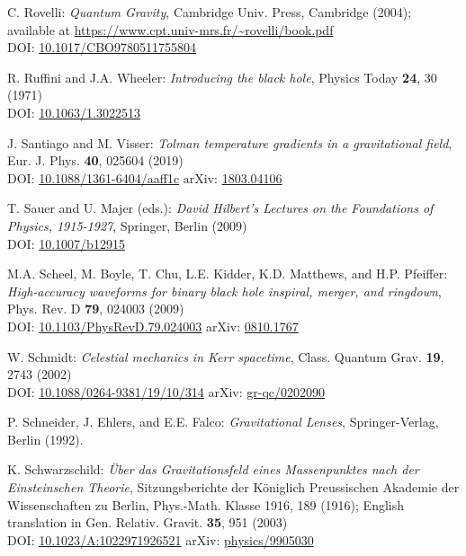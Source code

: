 \begin{thebibliography}{123}
C. Rovelli:
{\em Quantum Gravity},
Cambridge Univ. Press, Cambridge (2004); available at
\url{https://www.cpt.univ-mrs.fr/~rovelli/book.pdf}\\
DOI: \href{https://doi.org/10.1017/CBO9780511755804}{10.1017/CBO9780511755804}

R. Ruffini and J.A. Wheeler:
{\em Introducing the black hole},
Physics Today {\bf 24}, 30 (1971)\\
DOI: \href{https://doi.org/10.1063/1.3022513}{10.1063/1.3022513}

J. Santiago and M. Visser:
{\em Tolman temperature gradients in a gravitational field},
Eur. J. Phys. {\bf 40}, 025604 (2019)\\
DOI: \href{https://doi.org/10.1088/1361-6404/aaff1c}{10.1088/1361-6404/aaff1c}\hfill
arXiv: \href{https://arxiv.org/abs/1803.04106}{1803.04106}

T. Sauer and U. Majer (eds.):
{\em David Hilbert’s Lectures on the Foundations of Physics, 1915-1927},
Springer, Berlin (2009)\\
DOI: \href{https://doi.org/10.1007/b12915}{10.1007/b12915}

M.A. Scheel, M. Boyle, T. Chu, L.E. Kidder, K.D. Matthews, and H.P. Pfeiffer:
{\em High-accuracy waveforms for binary black hole inspiral, merger, and ringdown},
Phys. Rev. D {\bf 79}, 024003 (2009)\\
DOI: \href{https://doi.org/10.1103/PhysRevD.79.024003}{10.1103/PhysRevD.79.024003}\hfill
arXiv: \href{https://arxiv.org/abs/0810.1767}{0810.1767}

W. Schmidt:
{\em Celestial mechanics in Kerr spacetime},
Class. Quantum Grav. {\bf 19}, 2743 (2002)\\
DOI: \href{https://doi.org/10.1088/0264-9381/19/10/314}{10.1088/0264-9381/19/10/314}\hfill
arXiv: \href{https://arxiv.org/abs/gr-qc/0202090}{gr-qc/0202090}

P. Schneider, J. Ehlers, and E.E. Falco:
{\em Gravitational Lenses},
Springer-Verlag, Berlin (1992).

K. Schwarzschild:
{\em \"Uber das Gravitationsfeld eines Massenpunktes nach der Einsteinschen Theorie},
Sitzungsberichte der K\"oniglich Preussischen Akademie der Wissenschaften zu Berlin, Phys.-Math. Klasse 1916, 189 (1916);
English translation in Gen. Relativ. Gravit. {\bf 35}, 951 (2003)\\
DOI: \href{https://doi.org/10.1023/A:1022971926521}{10.1023/A:1022971926521}\hfill
arXiv: \href{https://arxiv.org/abs/physics/9905030}{physics/9905030}


\end{thebibliography}
